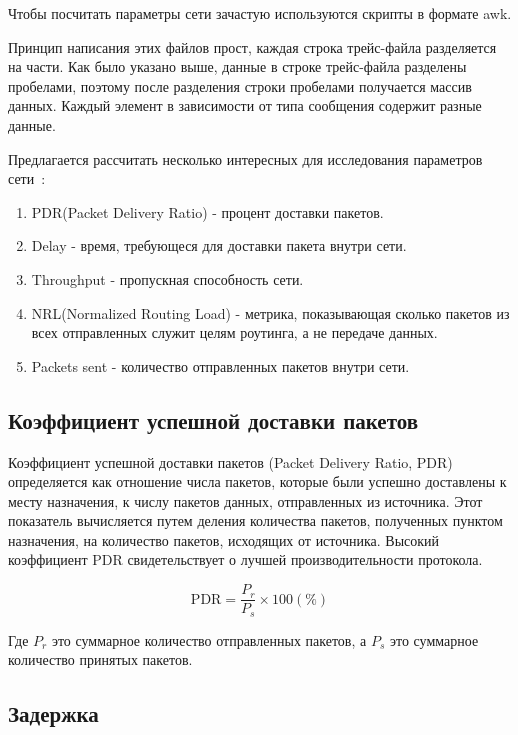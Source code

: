 Чтобы посчитать параметры сети зачастую используются скрипты в формате awk. 

Принцип написания этих файлов прост, каждая строка трейс-файла разделяется на части. Как было указано выше, данные в строке трейс-файла разделены пробелами, поэтому после разделения строки пробелами получается массив данных. Каждый элемент в зависимости от типа сообщения содержит разные данные. 

Предлагается рассчитать несколько интересных для исследования параметров сети~\cite{taneja2011evaluation}:

\begin{enumerate}
  \item PDR(Packet Delivery Ratio) - процент доставки пакетов.
  \item Delay - время, требующеся для доставки пакета внутри сети.
  \item Throughput - пропускная способность сети.
  \item NRL(Normalized Routing Load) - метрика, показывающая сколько пакетов из всех отправленных служит целям роутинга, а не передаче данных.
  \item Packets sent - количество отправленных пакетов внутри сети.
\end{enumerate}

\subsection*{Коэффициент успешной доставки пакетов}

Коэффициент успешной доставки пакетов (Packet Delivery Ratio, PDR) определяется как отношение числа пакетов, которые были успешно доставлены к месту назначения, к числу пакетов данных, отправленных из источника. Этот показатель вычисляется путем деления количества пакетов, полученных пунктом назначения, на количество пакетов, исходящих от источника. Высокий коэффициент PDR свидетельствует о лучшей производительности протокола.

\begin{equation}
  \label{eq:pdr_calculation}
  \text{PDR} = \frac{P_r}{P_s} \times 100(\%)
\end{equation}

Где $P_r$ это суммарное количество отправленных пакетов, а $P_s$ это суммарное количество принятых пакетов.

\subsection*{Задержка}


